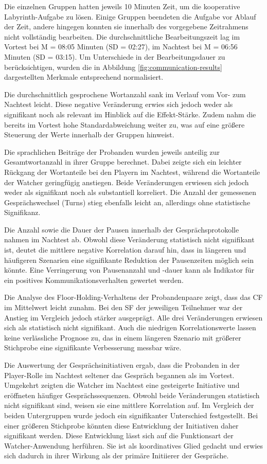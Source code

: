  Die einzelnen Gruppen hatten jeweils 10 Minuten Zeit, um die kooperative Labyrinth-Aufgabe zu lösen. Einige Gruppen beendeten die Aufgabe vor Ablauf der Zeit, andere hingegen konnten sie innerhalb des vorgegebene Zeitrahmens nicht vollständig bearbeiten. Die durchschnittliche Bearbeitungszeit lag im Vortest bei M = 08:05 Minuten (SD = 02:27), im Nachtest bei M = 06:56 Minuten (SD = 03:15). Um Unterschiede in der Bearbeitungsdauer zu berücksichtigen, wurden die in Abbildung \ref{fig:communication-results} dargestellten Merkmale entsprechend normalisiert.

 Die durchschnittlich gesprochene Wortanzahl sank im Verlauf vom Vor- zum Nachtest leicht. Diese negative Veränderung erwies sich jedoch weder als signifikant noch als relevant im Hinblick auf die Effekt-Stärke. Zudem nahm die bereits im Vortest hohe Standardabweichung weiter zu, was auf eine größere Steuerung der Werte innerhalb der Gruppen hinweist.

 Die sprachlichen Beiträge der Probanden wurden jeweils anteilig zur Gesamtwortanzahl in ihrer Gruppe berechnet. Dabei zeigte sich ein leichter Rückgang der Wortanteile bei den Playern im Nachtest, während die Wortanteile der Watcher geringfügig anstiegen. Beide Veränderungen erwiesen sich jedoch weder als signifikant noch als substantiell korreliert. Die Anzahl der gemessenen Gesprächswechsel (Turns) stieg ebenfalls leicht an, allerdings ohne statistische Signifikanz.

Die Anzahl sowie die Dauer der Pausen innerhalb der Gesprächsprotokolle nahmen im Nachtest ab. Obwohl diese Veränderung statistisch nicht signifikant ist, deutet die mittlere negative Korrelation darauf hin, dass in längeren und häufigeren Szenarien eine signifikante Reduktion der Pausenzeiten möglich sein könnte. Eine Verringerung von Pausenanzahl und -dauer kann als Indikator für ein positives Kommunikationsverhalten gewertet werden.

Die Analyse des Floor-Holding-Verhaltens der Probandenpaare zeigt, dass das \ac{CF} im Mittelwert leicht zunahm. Bei den \ac{SF} der jeweiligen Teilnehmer war der Anstieg im Vergleich jedoch stärker ausgeprägt. Alle drei Veränderungen erwiesen sich als statistisch nicht signifikant. Auch die niedrigen Korrelationswerte lassen keine verlässliche Prognose zu, das in einem längeren Szenario mit größerer Stichprobe eine signifikante Verbesserung messbar wäre.

Die Auswertung der Gesprächsinitiativen ergab, dass die Probanden in der Player-Rolle im Nachtest seltener das Gespräch begannen als im Vortest. Umgekehrt zeigten die Watcher im Nachtest eine gesteigerte Initiative und eröffneten häufiger Gesprächssequenzen. Obwohl beide Veränderungen statistisch nicht signifikant sind, weisen sie eine mittlere Korrelation auf. Im Vergleich der beiden Untergruppen wurde jedoch ein signifikanter Unterschied festgestellt. Bei einer größeren Stichprobe könnten diese Entwicklung der Initiativen daher signifikant werden. Diese Entwicklung lässt sich auf die Funktionsart der Watcher-Anwendung herführen. Sie ist als koordinatives Glied gedacht und erwies sich dadurch in ihrer Wirkung als der primäre Initiierer der Gespräche.

